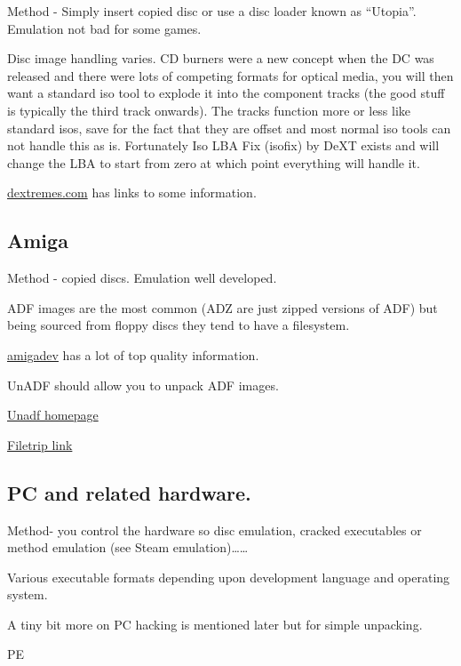 \documentclass[
]{book}
\begin{document}
Method - Simply insert copied disc or use a disc loader known as ``Utopia''. Emulation not bad for some games.

Disc image handling varies. CD burners were a new concept when the DC was released and there were lots of competing formats for optical media, you will then want a standard iso tool to explode it into the component tracks (the good stuff is typically the third track onwards). The tracks function more or less like standard isos, save for the fact that they are offset and most normal iso tools can not handle this as is. Fortunately Iso LBA Fix (isofix) by DeXT exists and will change the LBA to start from zero at which point everything will handle it.

\href{http://dextremes.com/dc/data/index.html}{dextremes.com} has links to some information.

\hypertarget{amiga}{%
\subsection{Amiga}\label{amiga}}

Method - copied discs. Emulation well developed.

ADF images are the most common (ADZ are just zipped versions of ADF) but being sourced from floppy discs they tend to have a filesystem.

\href{http://amigadev.elowar.com/}{amigadev} has a lot of top quality information.

UnADF should allow you to unpack ADF images.

\href{http://lclevy.free.fr/adflib/unadf.html}{Unadf homepage}

\href{http://filetrip.net/pc-downloads/applications/download-unadf-10-f25764.html}{Filetrip link}

\hypertarget{pc-and-related-hardware.}{%
\subsection{PC and related hardware.}\label{pc-and-related-hardware.}}

Method- you control the hardware so disc emulation, cracked executables or method emulation (see Steam emulation)\ldots\ldots{}

Various executable formats depending upon development language and operating system.

A tiny bit more on PC hacking is mentioned later but for simple unpacking.

PE
\end{document}
